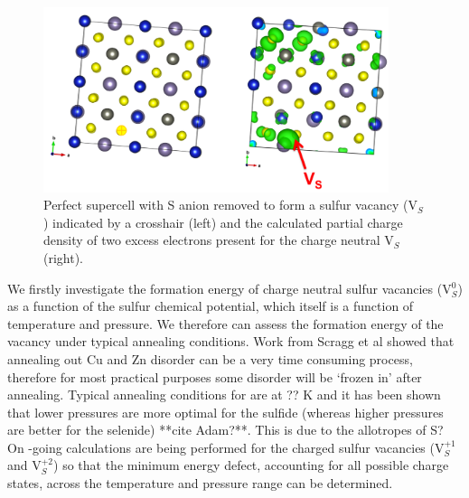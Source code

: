 \begin{figure}[h!]
  \centering
    \includegraphics[width=0.9\textwidth]{figures/V_S-neutral-PARCHG.png}
    \caption{Perfect {\CZTS } supercell with S anion removed to form a sulfur vacancy (V$_S$) indicated by a crosshair (left) and the calculated partial charge density of two excess electrons present for the charge neutral V$_S$ (right).}
  \label{V_S-neutral-PARCHG}
\end{figure}

We firstly investigate the formation energy of charge neutral sulfur vacancies (V$_{S}^{0}$) as a function of the sulfur chemical potential, which itself is a function of temperature and pressure. We therefore can assess the formation energy of the vacancy under typical annealing conditions. Work from Scragg et al showed that annealing out Cu and Zn disorder can be a very time consuming process, therefore for most practical purposes some disorder will be `frozen in' after annealing. Typical annealing conditions for { \CZTS } are at ?? K and it has been shown that lower pressures are more optimal for the sulfide (whereas higher pressures are better for the selenide) **cite Adam?**. This is due to the allotropes of S?\\
On -going calculations are being performed for the charged sulfur vacancies (V$_{S}^{+1}$ and V$_{S}^{+2}$) so that the minimum energy defect, accounting for all possible charge states, across the temperature and pressure range can be determined.





